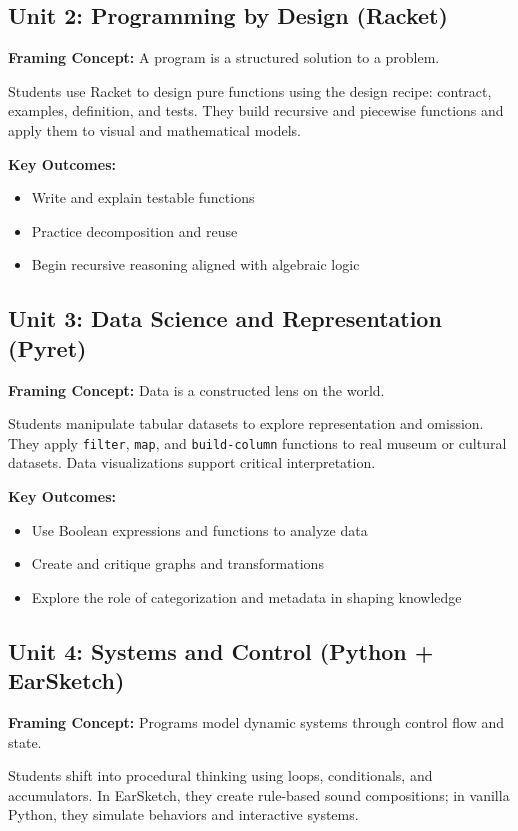 \documentclass[11pt]{article}
\begin{document}
\subsection*{Unit 2: Programming by Design (Racket)}
\textbf{Framing Concept:} A program is a structured solution to a problem.

Students use Racket to design pure functions using the design recipe: contract, examples, definition, and tests. They build recursive and piecewise functions and apply them to visual and mathematical models.

\textbf{Key Outcomes:}
\begin{itemize}[leftmargin=*]
  \item Write and explain testable functions
  \item Practice decomposition and reuse
  \item Begin recursive reasoning aligned with algebraic logic
\end{itemize}

\subsection*{Unit 3: Data Science and Representation (Pyret)}
\textbf{Framing Concept:} Data is a constructed lens on the world.

Students manipulate tabular datasets to explore representation and omission. They apply \texttt{filter}, \texttt{map}, and \texttt{build-column} functions to real museum or cultural datasets. Data visualizations support critical interpretation.

\textbf{Key Outcomes:}
\begin{itemize}[leftmargin=*]
  \item Use Boolean expressions and functions to analyze data
  \item Create and critique graphs and transformations
  \item Explore the role of categorization and metadata in shaping knowledge
\end{itemize}

\subsection*{Unit 4: Systems and Control (Python + EarSketch)}
\textbf{Framing Concept:} Programs model dynamic systems through control flow and state.

Students shift into procedural thinking using loops, conditionals, and accumulators. In EarSketch, they create rule-based sound compositions; in vanilla Python, they simulate behaviors and interactive systems.
\end{document}
